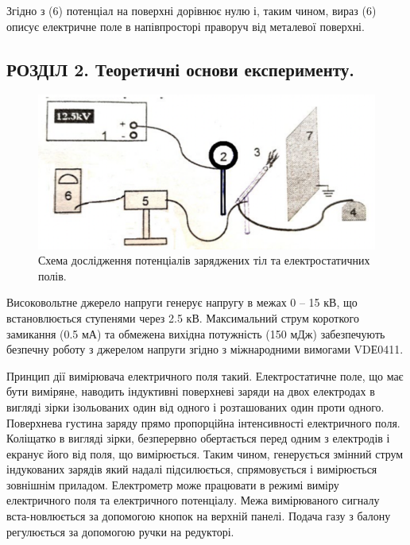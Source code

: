 \documentclass[a4paper,12pt]{article}
\begin{document}
\begin{justify}
	Згідно з (6) потенціал на поверхні дорівнює нулю і, таким чином, вираз (6) описує електричне поле в напівпросторі праворуч від металевої поверхні.
	
	
	
\newpage
	\begin{center}
		\section* {РОЗДІЛ 2. Теоретичні основи експерименту.}
	\end{center}
	\begin{figure}[h!]
		\begin{center}
			\includegraphics[scale=0.8]{media/graph10}
		\end{center}
		\caption{Схема дослідження потенціалів заряджених тіл та електростатичних полів.}
		\label{Picture_2}
	\end{figure}

	Високовольтне джерело напруги генерує напругу в межах 0 – 15 кВ, що встановлюється ступенями через 2.5 кВ. Максимальний струм короткого замикання (0.5 мА) та обмежена вихідна потужність (150 мДж) забезпечують безпечну роботу з джерелом напруги згідно з міжнародними вимогами VDЕ0411.
	
	Принцип дії вимірювача електричного поля такий. Електростатичне поле, що має бути виміряне, наводить індуктивні поверхневі заряди на двох електродах в вигляді зірки ізольованих один від одного і розташованих один проти одного. Поверхнева густина заряду прямо пропорційна інтенсивності електричного поля. Коліщатко в вигляді зірки, безперервно обертається перед одним з електродів і екранує його від поля, що вимірюється. Таким чином, генерується змінний струм індукованих зарядів який надалі підсилюється, спрямовується і вимірюється зовнішнім приладом. Електрометр може працювати в режимі виміру електричного поля та електричного потенціалу. Межа вимірюваного сигналу вста-новлюється за допомогою кнопок на верхній панелі. Подача газу з балону регулюється за допомогою ручки на редукторі.
\newpage


\end{justify}
\end{document}

